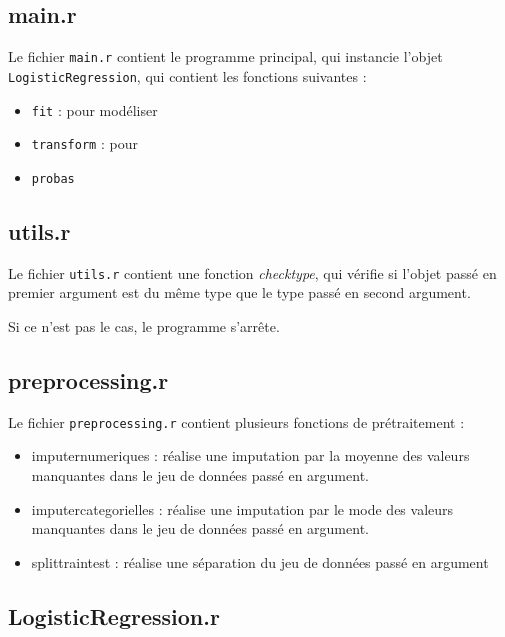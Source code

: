 \documentclass[10pt,french]{report}
\begin{document}
	\subsection{main.r}
	
	Le fichier \texttt{main.r} contient le programme principal, qui instancie l'objet \texttt{LogisticRegression}, qui contient les fonctions suivantes :
	
	\begin{itemize}
		\item \texttt{fit} : pour modéliser
		\item \texttt{transform} : pour 
		\item \texttt{probas}
	\end{itemize}
	
	\subsection{utils.r}
	
	Le fichier \texttt{utils.r} contient une fonction \textit{check\textunderscore type}, qui vérifie si l'objet passé en premier argument est du même type que le type passé en second argument.
	
	Si ce n'est pas le cas, le programme s'arrête.
	
	\subsection{preprocessing.r}
	
	Le fichier \texttt{preprocessing.r} contient plusieurs fonctions de prétraitement :
	
	\begin{itemize}
		\item imputer\textunderscore numeriques : réalise une imputation par la moyenne des valeurs manquantes dans le jeu de données passé en argument.
		\item imputer\textunderscore categorielles : réalise une imputation par le mode des valeurs manquantes dans le jeu de données passé en argument.
		\item split\textunderscore train\textunderscore test : réalise une séparation du jeu de données passé en argument
	\end{itemize}
	
	\subsection{LogisticRegression.r}
	
\end{document}

